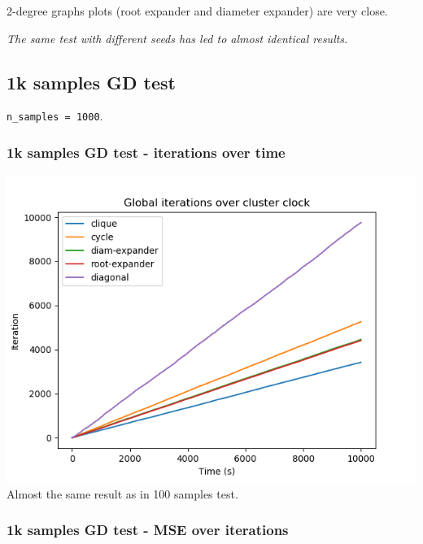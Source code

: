 \documentclass[11pt]{article}
\makeatletter
\def\maxwidth{\ifdim\Gin@nat@width>\linewidth\linewidth
    \else\Gin@nat@width\fi}
\let\Oldincludegraphics\includegraphics
\renewcommand{\includegraphics}[1]{\Oldincludegraphics[width=.8\maxwidth]{#1}}
\makeatother
\begin{document}
2-degree graphs plots (root expander and diameter expander) are very
close.

\emph{The same test with different seeds has led to almost identical
results.}

    \subsection{1k samples GD test}\label{k-samples-gd-test}

\texttt{n\_samples\ =\ 1000}.

    \subsubsection{1k samples GD test - iterations over
time}\label{k-samples-gd-test---iterations-over-time}

\includegraphics{media/img/tests/test_003_1ksamples_classic/1_iter_time.png}
Almost the same result as in 100 samples test.

    \subsubsection{1k samples GD test - MSE over
iterations}\label{k-samples-gd-test---mse-over-iterations}
\end{document}

